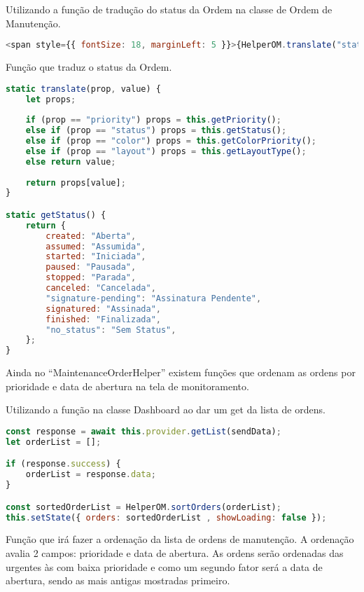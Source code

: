 Utilizando a função de tradução do status da Ordem na classe de Ordem de Manutenção.

\begin{lstlisting}[language=JavaScript, caption={Utilizando a tradução de termos da ordem de manutenção}]
<span style={{ fontSize: 18, marginLeft: 5 }}>{HelperOM.translate("status", order.orderStatus)}</span>
\end{lstlisting}

Função que traduz o status da Ordem.

\begin{lstlisting}[language=JavaScript, caption={Função de tradução}]
static translate(prop, value) {
	let props;
	
	if (prop == "priority") props = this.getPriority();
	else if (prop == "status") props = this.getStatus();
	else if (prop == "color") props = this.getColorPriority();
	else if (prop == "layout") props = this.getLayoutType();
	else return value;
	
	return props[value];
}

static getStatus() {
	return {
		created: "Aberta",
		assumed: "Assumida",
		started: "Iniciada",
		paused: "Pausada",
		stopped: "Parada",
		canceled: "Cancelada",
		"signature-pending": "Assinatura Pendente",
		signatured: "Assinada",
		finished: "Finalizada",
		"no_status": "Sem Status",
	};
}
\end{lstlisting}

Ainda no ``MaintenanceOrderHelper'' existem funções que ordenam as ordens por prioridade e data de abertura na tela de monitoramento.

Utilizando a função na classe Dashboard ao dar um get da lista de ordens.

\begin{lstlisting}[language=JavaScript, caption={Ordenando pedidos após a consulta no servidor}]
const response = await this.provider.getList(sendData);
let orderList = [];

if (response.success) {
	orderList = response.data;
}

const sortedOrderList = HelperOM.sortOrders(orderList);
this.setState({ orders: sortedOrderList , showLoading: false });
\end{lstlisting}

Função que irá fazer a ordenação da lista de ordens de manutenção. A ordenação avalia 2 campos: prioridade e data de abertura.
As ordens serão ordenadas das urgentes às com baixa prioridade e como um segundo fator será a data de abertura, sendo as mais antigas mostradas primeiro.

